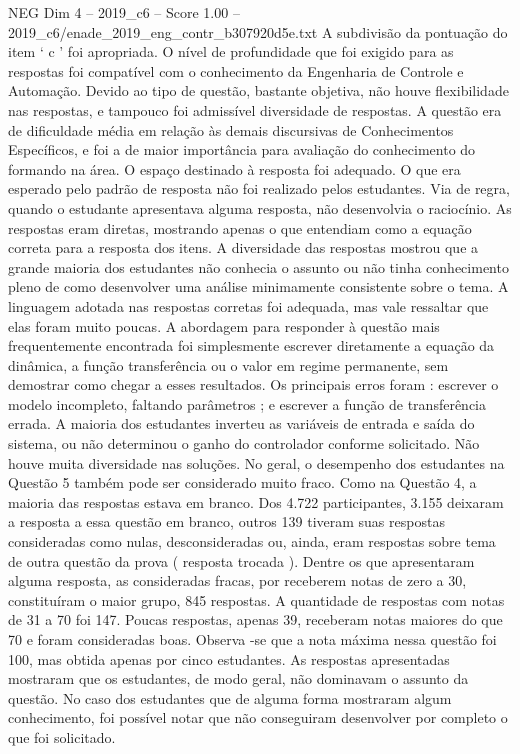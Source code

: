 \begin{textsample}{NEG Dim 4 – 2019\_c6 – Score 1.00 – 2019\_c6/enade\_2019\_eng\_contr\_b307920d5e.txt}
A subdivisão da pontuação do item ‘ c ’ foi apropriada.
O nível de profundidade que foi exigido para as respostas foi compatível com o conhecimento da Engenharia de Controle e Automação.
Devido ao tipo de questão, bastante objetiva, não houve flexibilidade nas respostas, e tampouco foi admissível diversidade de respostas.
A questão era de dificuldade média em relação às demais discursivas de Conhecimentos Específicos, e foi a de maior importância para avaliação do conhecimento do formando na área.
O espaço destinado à resposta foi adequado.
O que era esperado pelo padrão de resposta não foi realizado pelos estudantes.
Via de regra, quando o estudante apresentava alguma resposta, não desenvolvia o raciocínio.
As respostas eram diretas, mostrando apenas o que entendiam como a equação correta para a resposta dos itens.
A diversidade das respostas mostrou que a grande maioria dos estudantes não conhecia o assunto ou não tinha conhecimento pleno de como desenvolver uma análise minimamente consistente sobre o tema.
A linguagem adotada nas respostas corretas foi adequada, mas vale ressaltar que elas foram muito poucas.
A abordagem para responder à questão mais frequentemente encontrada foi simplesmente escrever diretamente a equação da dinâmica, a função transferência ou o valor em regime permanente, sem demostrar como chegar a esses resultados.
Os principais erros foram : escrever o modelo incompleto, faltando parâmetros ; e escrever a função de transferência errada.
A maioria dos estudantes inverteu as variáveis de entrada e saída do sistema, ou não determinou o ganho do controlador conforme solicitado.
Não houve muita diversidade nas soluções.
No geral, o desempenho dos estudantes na Questão 5 também pode ser considerado muito fraco.
Como na Questão 4, a maioria das respostas estava em branco.
Dos 4.722 participantes, 3.155 deixaram a resposta a essa questão em branco, outros 139 tiveram suas respostas consideradas como nulas, desconsideradas ou, ainda, eram respostas sobre tema de outra questão da prova ( resposta trocada ).
Dentre os que apresentaram alguma resposta, as consideradas fracas, por receberem notas de zero a 30, constituíram o maior grupo, 845 respostas.
A quantidade de respostas com notas de 31 a 70 foi 147.
Poucas respostas, apenas 39, receberam notas maiores do que 70 e foram consideradas boas.
Observa -se que a nota máxima nessa questão foi 100, mas obtida apenas por cinco estudantes.
As respostas apresentadas mostraram que os estudantes, de modo geral, não dominavam o assunto da questão.
No caso dos estudantes que de alguma forma mostraram algum conhecimento, foi possível notar que não conseguiram desenvolver por completo o que foi solicitado.

\end{textsample}

